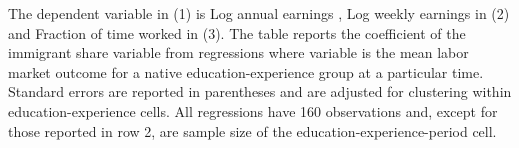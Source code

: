 \begin{table}[H]
\begin{center}
\begin{tabular}{lccc}
\vspace{0.3mm}\\ \hline  \hline \end{tabular}
\begin{tablenotes}
\begin{small}
\item
The dependent variable in (1) is Log annual earnings , Log weekly earnings in (2) and Fraction of time worked in (3). The table reports the coefficient of the immigrant share variable from regressions where variable is  the mean labor market outcome for a native education-experience group at a particular time. Standard errors are reported in parentheses and are adjusted for clustering within education-experience cells. All regressions have 160
observations and, except for those reported in row 2, are sample size of the education-experience-period cell.
\end{small}
\end{tablenotes} 

\end{center}
\end{table}
